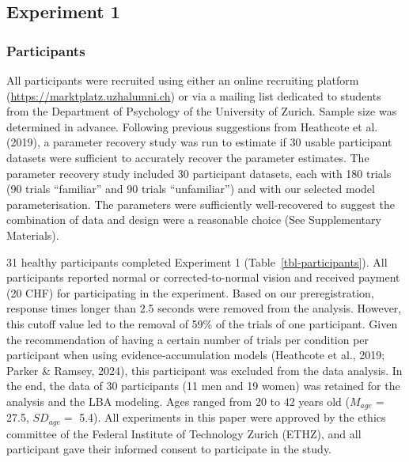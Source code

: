 \documentclass[
  letterpaper,
  DIV=11,
  numbers=noendperiod]{scrartcl}
\begin{document}
\subsection{Experiment 1}\label{experiment-1}

\subsubsection{Participants}\label{participants}

All participants were recruited using either an online recruiting
platform (\url{https://marktplatz.uzhalumni.ch}) or via a mailing list
dedicated to students from the Department of Psychology of the
University of Zurich. Sample size was determined in advance. Following
previous suggestions from Heathcote et al. (2019), a parameter recovery
study was run to estimate if 30 usable participant datasets were
sufficient to accurately recover the parameter estimates. The parameter
recovery study included 30 participant datasets, each with 180 trials
(90 trials ``familiar'' and 90 trials ``unfamiliar'') and with our
selected model parameterisation. The parameters were sufficiently
well-recovered to suggest the combination of data and design were a
reasonable choice (See Supplementary Materials).

31 healthy participants completed Experiment 1
(Table~\ref{tbl-participants}). All participants reported normal or
corrected-to-normal vision and received payment (20 CHF) for
participating in the experiment. Based on our preregistration, response
times longer than 2.5 seconds were removed from the analysis. However,
this cutoff value led to the removal of 59\% of the trials of one
participant. Given the recommendation of having a certain number of
trials per condition per participant when using evidence-accumulation
models (Heathcote et al., 2019; Parker \& Ramsey, 2024), this
participant was excluded from the data analysis. In the end, the data of
30 participants (11 men and 19 women) was retained for the analysis and
the LBA modeling. Ages ranged from 20 to 42 years old (\(M_{age} =\)
27.5, \(SD_{age} =\) 5.4). All experiments in this paper were approved
by the ethics committee of the Federal Institute of Technology Zurich
(ETHZ), and all participant gave their informed consent to participate
in the study.
\end{document}
